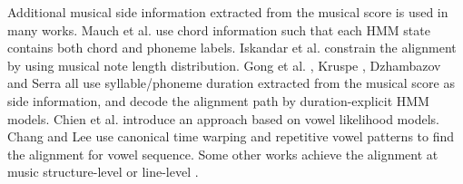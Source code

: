 Additional musical side information extracted from the musical score is used in many works. Mauch et al.  use chord information such that each HMM state contains both chord and phoneme labels. Iskandar et al.  constrain the alignment by using musical note length distribution. Gong et al. , Kruspe , Dzhambazov and Serra  all use syllable/phoneme duration extracted from the musical score as side information, and decode the alignment path by duration-explicit HMM models. Chien et al.  introduce an approach based on vowel likelihood models. Chang and Lee  use canonical time warping and repetitive vowel patterns to find the alignment for vowel sequence. Some other works achieve the alignment at music structure-level  or line-level .

